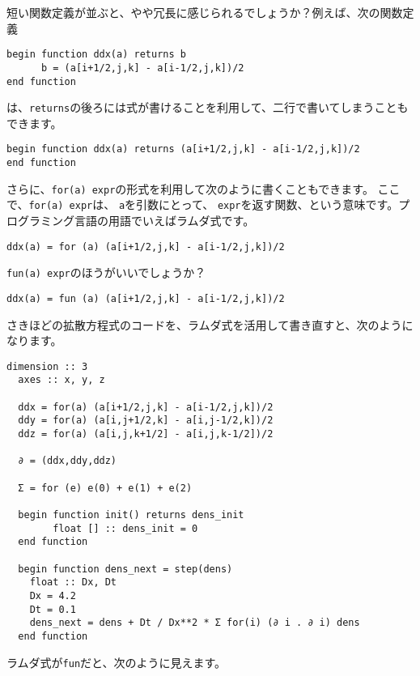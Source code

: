 \documentclass{jsarticle}
\begin{document}
短い関数定義が並ぶと、やや冗長に感じられるでしょうか？例えば、次の関数定義

\begin{lstlisting}[mathescape]
begin function ddx(a) returns b
      b = (a[i+1/2,j,k] - a[i-1/2,j,k])/2
end function
\end{lstlisting}

は、\verb`returns`の後ろには式が書けることを利用して、二行で書いてしまうこともできます。

\begin{lstlisting}[mathescape]
begin function ddx(a) returns (a[i+1/2,j,k] - a[i-1/2,j,k])/2
end function
\end{lstlisting}

さらに、\verb`for(a) expr`の形式を利用して次のように書くこともできます。
ここで、\verb`for(a) expr`は、
\verb`a`を引数にとって、
\verb`expr`を返す関数、という意味です。プログラミング言語の用語でいえばラムダ式です。

\begin{lstlisting}[mathescape]
ddx(a) = for (a) (a[i+1/2,j,k] - a[i-1/2,j,k])/2
\end{lstlisting}

\verb`fun(a) expr`のほうがいいでしょうか？

\begin{lstlisting}[mathescape]
ddx(a) = fun (a) (a[i+1/2,j,k] - a[i-1/2,j,k])/2
\end{lstlisting}


さきほどの拡散方程式のコードを、ラムダ式を活用して書き直すと、次のようになります。

\begin{lstlisting}[mathescape]
  dimension :: 3
  axes :: x, y, z

  ddx = for(a) (a[i+1/2,j,k] - a[i-1/2,j,k])/2
  ddy = for(a) (a[i,j+1/2,k] - a[i,j-1/2,k])/2
  ddz = for(a) (a[i,j,k+1/2] - a[i,j,k-1/2])/2

  ∂ = (ddx,ddy,ddz)

  Σ = for (e) e(0) + e(1) + e(2)

  begin function init() returns dens_init
        float [] :: dens_init = 0
  end function

  begin function dens_next = step(dens)
    float :: Dx, Dt
    Dx = 4.2
    Dt = 0.1
    dens_next = dens + Dt / Dx**2 * Σ for(i) (∂ i . ∂ i) dens
  end function
\end{lstlisting}

ラムダ式が\verb`fun`だと、次のように見えます。
\end{document}
